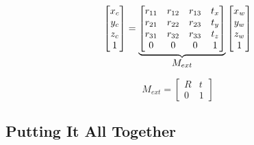 \begin{equation}
    \begin{bmatrix}
        x_c \\ y_c \\ z_c \\ 1
    \end{bmatrix}
    =
    \underbrace{
        \begin{bmatrix}
            r_{11} & r_{12} & r_{13} & t_x \\
            r_{21} & r_{22} & r_{23} & t_y \\
            r_{31} & r_{32} & r_{33} & t_z \\
            0      & 0      & 0      & 1
        \end{bmatrix}
    }_{\mathlarger{M_{ext}}}
    \begin{bmatrix}
        x_w \\ y_w \\ z_w \\1
    \end{bmatrix}
\end{equation}

\begin{equation}
    M_{ext} =
    \begin{bmatrix}
        R & t \\
        0 & 1
    \end{bmatrix}
\end{equation}

\subsection{Putting It All Together}

